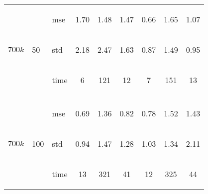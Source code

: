 \documentclass{article} %
\newcommand{\efoo}{\end{footnotesize}}
\newcommand{\bfoo}{\begin{footnotesize}}
\begin{document}
\begin{table}[t]
\begin{center}
\begin{small}
\begin{sc}
\begin{tabular}{lllcccccc}
\\
\multirow{3}{*}{$700k$}&\multirow{3}{*}{50}&\bfoo mse\efoo&1.70&1.48&1.47&0.66&1.65&1.07\\
&&\bfoo std\efoo &2.18&2.47&1.63&0.87&1.49&0.95\\
&&\bfoo time\efoo &6&121&12&7&151&13\\

\\
\multirow{3}{*}{$700k$}&\multirow{3}{*}{100}&\bfoo mse\efoo&0.69&1.36&0.82&0.78&1.52&1.43\\
&&\bfoo std\efoo &0.94&1.47&1.28&1.03&1.34&2.11\\
&&\bfoo time\efoo &13&321&41&12&325&44\\

 \hline
\end{tabular}
\end{sc}
\end{small}
\end{center}
\vskip -0.1in
\end{table}
\end{document}
